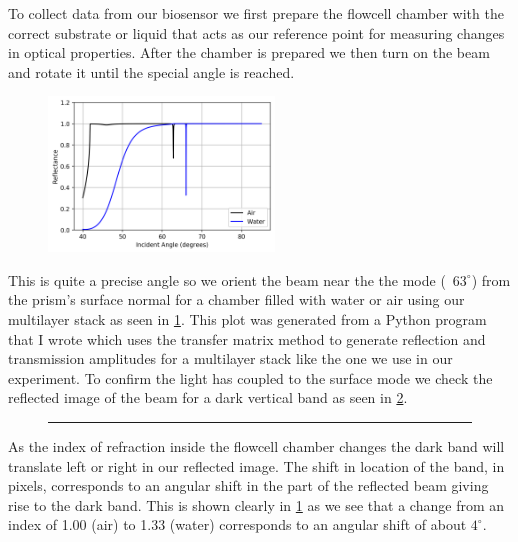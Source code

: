 \documentclass{article}
\begin{document}
To collect data from our biosensor we first prepare the flowcell chamber with the correct substrate or liquid that acts as our reference point for measuring changes in optical properties. After the chamber is prepared we then turn on the beam and rotate it until the special angle is reached. 

\begin{figure}
    \includegraphics[width=6cm]{reflectivity_dip.png}
    \label{fig:SEW}
\end{figure}

This is quite a precise angle so we orient the beam near the the mode (~$63^{\circ}$) from the prism's surface normal for a chamber filled with water or air using our multilayer stack as seen in \ref{fig:SEW}. This plot was generated from a Python program that I wrote which uses the transfer matrix method to generate reflection and transmission amplitudes for a multilayer stack like the one we use in our experiment. To confirm the light has coupled to the surface mode we check the reflected image of the beam for a dark vertical band as seen in \ref{fig:darkband}.

\begin{figure}
    \rule{6cm}{4cm}
    \label{fig:darkband}
\end{figure}

As the index of refraction inside the flowcell chamber changes the dark band will translate left or right in our reflected image. The shift in location of the band, in pixels, corresponds to an angular shift in the part of the reflected beam giving rise to the dark band. This is shown clearly in \ref{fig:SEW} as we see that a change from an index of 1.00 (air) to 1.33 (water) corresponds to an angular shift  of about $4^\circ$.
\end{document}

